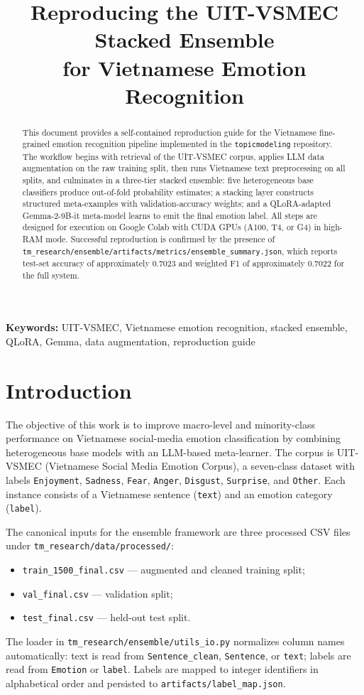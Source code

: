 \documentclass[11pt,a4paper]{article}
\title{Reproducing the UIT-VSMEC Stacked Ensemble\\for Vietnamese Emotion Recognition}
\author{}
\date{}
\newcommand{\repo}[1]{\texttt{#1}}
\begin{document}
\maketitle

\begin{abstract}
This document provides a self-contained reproduction guide for the Vietnamese fine-grained emotion recognition pipeline implemented in the \repo{topicmodeling} repository. The workflow begins with retrieval of the UIT-VSMEC corpus, applies LLM data augmentation on the raw training split, then runs Vietnamese text preprocessing on all splits, and culminates in a three-tier stacked ensemble: five heterogeneous base classifiers produce out-of-fold probability estimates; a stacking layer constructs structured meta-examples with validation-accuracy weights; and a QLoRA-adapted Gemma-2-9B-it meta-model learns to emit the final emotion label. All steps are designed for execution on Google Colab with CUDA GPUs (A100, T4, or G4) in high-RAM mode. Successful reproduction is confirmed by the presence of \repo{tm\_research/ensemble/artifacts/metrics/ensemble\_summary.json}, which reports test-set accuracy of approximately 0.7023 and weighted F1 of approximately 0.7022 for the full system.
\end{abstract}

\noindent\textbf{Keywords:} UIT-VSMEC, Vietnamese emotion recognition, stacked ensemble, QLoRA, Gemma, data augmentation, reproduction guide

\section{Introduction}
\label{sec:intro}

The objective of this work is to improve macro-level and minority-class performance on Vietnamese social-media emotion classification by combining heterogeneous base models with an LLM-based meta-learner. The corpus is UIT-VSMEC (Vietnamese Social Media Emotion Corpus), a seven-class dataset with labels \texttt{Enjoyment}, \texttt{Sadness}, \texttt{Fear}, \texttt{Anger}, \texttt{Disgust}, \texttt{Surprise}, and \texttt{Other}. Each instance consists of a Vietnamese sentence (\texttt{text}) and an emotion category (\texttt{label}).

The canonical inputs for the ensemble framework are three processed CSV files under \repo{tm\_research/data/processed/}:
\begin{itemize}[nosep]
  \item \repo{train\_1500\_final.csv} --- augmented and cleaned training split;
  \item \repo{val\_final.csv} --- validation split;
  \item \repo{test\_final.csv} --- held-out test split.
\end{itemize}
The loader in \repo{tm\_research/ensemble/utils\_io.py} normalizes column names automatically: text is read from \texttt{Sentence\_clean}, \texttt{Sentence}, or \texttt{text}; labels are read from \texttt{Emotion} or \texttt{label}. Labels are mapped to integer identifiers in alphabetical order and persisted to \repo{artifacts/label\_map.json}.
\end{document}
